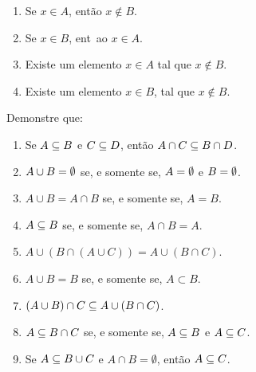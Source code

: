 \documentclass[12pt]{exam}
\begin{document}
    \begin{enumerate}[label={\roman*})]
        \item Se $x \in A$, então $x \notin B$.

        \item Se $x \in B$, ent~ao $x \in A$.

        \item Existe um elemento $x \in A$ tal que $x \notin B$.

        \item Existe um elemento $x \in B$, tal que $x \notin B$.
    \end{enumerate}
    \questao{} Demonstre que:
    \begin{enumerate}[label={\alph*})]
        \item Se $A \subseteq B$ e $C \subseteq D$, ent\~ao $A \cap C \subseteq B \cap D$.

        \item $A \cup B = \emptyset$ se, e somente se, $A = \emptyset$ e $B = \emptyset$.

        \item $A \cup B = A \cap B$ se, e somente se,  $A = B$.

        \item $A \subseteq B$ se, e somente se,  $A \cap B = A$.

        \item $A \cup (B \cap (A \cup C)) = A \cup (B \cap C)$.

        \item $A \cup B = B$ se, e somente se, $A \subset B$.

        \item $(A \cup B) \cap C \subseteq A \cup (B \cap C)$.

        \item $A \subseteq B \cap C$ se, e somente se, $A \subseteq B$ e $A \subseteq C$.

        \item Se $A \subseteq B \cup C$ e $A \cap B = \emptyset$, então $A \subseteq C$.
    \end{enumerate}
\end{document}
